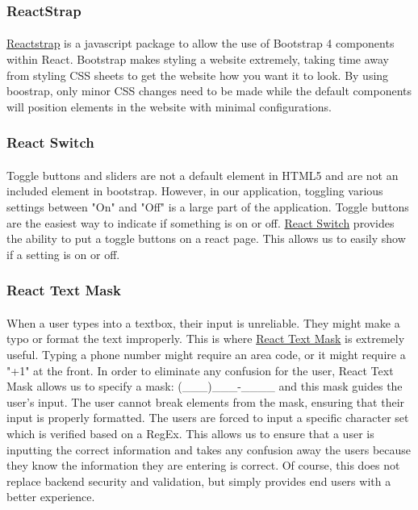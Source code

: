 \documentclass[12pt]{article}
\begin{document}
\subsubsection{ReactStrap}	
\paragraph{}
	\href{https://reactstrap.github.io/}{Reactstrap} is a javascript package to allow the use of Bootstrap 4 components within React. Bootstrap makes styling a website extremely, taking time away from styling CSS sheets to get the website how you want it to look. By using boostrap, only minor CSS changes need to be made while the default components will position elements in the website with minimal configurations.
	
	
\subsubsection{React Switch}	
\paragraph{}
	Toggle buttons and sliders are not a default element in HTML5 and are not an included element in bootstrap. However, in our application, toggling various settings between "On" and "Off" is a large part of the application. Toggle buttons are the easiest way to indicate if something is on or off. \href{https://www.npmjs.com/package/react-switch}{React Switch} provides the ability to put a toggle buttons on a react page. This allows us to easily show if a setting is on or off.
	
\subsubsection{React Text Mask}	
\paragraph{}
	When a user types into a textbox, their input is unreliable. They might make a typo or format the text improperly. This is where \href{https://www.npmjs.com/package/react-text-mask}{React Text Mask} is extremely useful. Typing a phone number might require an area code, or it might require a "+1" at the front. In order to eliminate any confusion for the user, React Text Mask allows us to specify a mask: (\_\_\_)\_\_\_-\_\_\_\_ and this mask guides the user's input. The user cannot break elements from the mask, ensuring that their input is properly formatted. The users are forced to input a specific character set which is verified based on a RegEx. This allows us to ensure that a user is inputting the correct information and takes any confusion away the users because they know the information they are entering is correct. Of course, this does not replace backend security and validation, but simply provides end users with a better experience.
	
\end{document}
